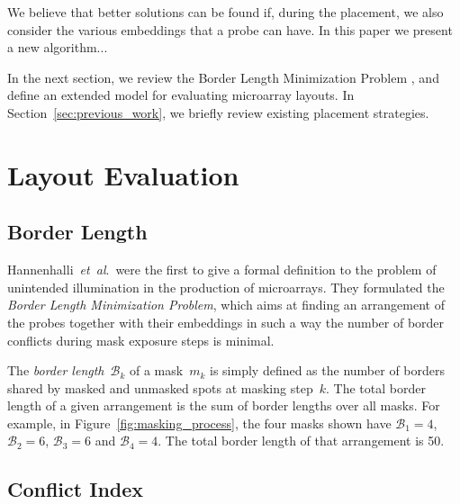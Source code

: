 \documentclass{llncs}
\begin{document}
We believe that better solutions can be found if, during the placement, we also
consider the various embeddings that a probe can have. In this paper we present
a new algorithm... %

In the next section, we review the Border Length Minimization Problem
\cite{HANNENHALLI02}, and define an extended model for evaluating microarray
layouts. In Section~\ref{sec:previous_work}, we briefly review existing
placement strategies. %


\section{Layout Evaluation}
\label{sec:eval}

\subsection{Border Length}

Hannenhalli~{\it et~al}.\ were the first to give a formal definition to the problem
of unintended illumination in the production of microarrays. They formulated the
\emph{Border Length Minimization Problem}\cite{HANNENHALLI02}, which aims at finding
an arrangement of the probes together with their embeddings in such a way the number
of border conflicts during mask exposure steps is minimal.

The \emph{border length}~$\mathcal{B}_k$ of a mask~$m_{k}$ is simply
defined as the number of borders shared by masked and unmasked spots
at masking step~$k$. The total border length of a given arrangement is
the sum of border lengths over all masks. For example, in
Figure~\ref{fig:masking_process}, the four masks shown have
$\mathcal{B}_1 = 4$, $\mathcal{B}_2 = 6$, $\mathcal{B}_3 = 6$ and $\mathcal{B}_4 = 4$.
The total border length of that arrangement is 50.

\subsection{Conflict Index}
\end{document}
